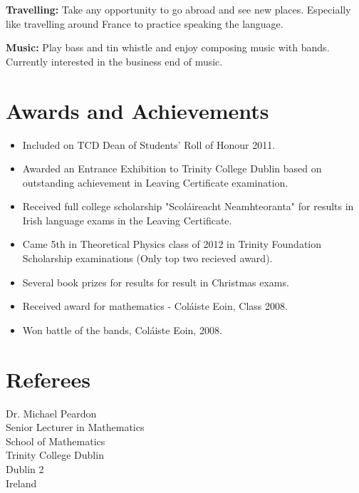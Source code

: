 \documentclass{res}
\newcommand{\fakeitem}{\hangindent=10pt\hangafter 1}
\begin{document}
\begin{resume}
\fakeitem
{\bf Travelling:} Take any opportunity to go abroad and see new places. Especially like travelling around France to practice speaking the language.

\fakeitem
{\bf Music:} Play bass and tin whistle and enjoy composing music with bands. Currently interested in the business end of music.



\section{Awards and Achievements}

\begin{itemize}
\item Included on TCD Dean of Students' Roll of Honour 2011.

\item Awarded an Entrance Exhibition to Trinity College Dublin based on outstanding achievement in Leaving Certificate examination.

\item Received full college scholarship "Scol\'aireacht Neamhteoranta" for results in Irish language exams in the Leaving Certificate.

\item Came 5th in Theoretical Physics class of 2012 in Trinity Foundation Scholarship examinations (Only top two recieved award).

\item Several book prizes for results for result in Christmas exams.

\item Received award for mathematics - Col\'aiste Eoin, Class 2008.

\item Won battle of the bands, Col\'aiste Eoin, 2008.

\end{itemize}



\section{Referees}

\begin{multicols}{2}
Dr. Michael Peardon\\
Senior Lecturer in Mathematics\\
School of Mathematics\\
Trinity College Dublin\\
Dublin 2\\
Ireland


\end{multicols}
\end{resume}
\end{document}
